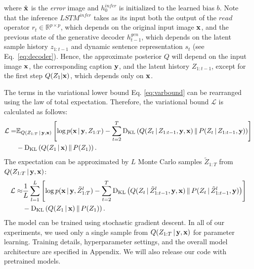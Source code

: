 \documentclass{article} %
\newcommand{\Eqref}[1]{Eq.~\ref{#1}} %
\newcommand{\given}{\,|\,}
\newcommand{\expectation}{\mathbb{E}}
\newcommand{\kldiv}{\mathrm{D}_{\rm KL}}
\newcommand{\klBars}{\,\|\,}
\newcommand{\hdec}{h^{gen}}
\newcommand{\henc}{h^{infer}}
\newcommand{\readop}{\mathit{read}}
\newcommand{\encoder}{\mathit{LSTM}^{infer}}
\newcommand{\Lat}{Z}
\newcommand{\numSamples}{L}
\newcommand{\sampleIdx}{l}
\newcommand{\LatSample}{\tilde{Z}}
\newcommand{\icaption}{{\bf{y}}}
\newcommand{\oimage}{{\bf{x}}}
\newcommand{\post}{Q}
\newcommand{\prior}{P}
\newcommand{\loss}{\mathcal{L}}
\newcommand{\real}{\mathbb{R}}
\begin{document}
where $\hat{\oimage}$ is the \textit{error} image and $\henc_0$ is initialized to the learned bias $b$. 
Note that the inference $\encoder$ 
takes as its input both the output
of the $\readop$ operator $r_t\in \real^{p\times p}$, which depends on the original input image $\oimage$,
and the previous state of the 
generative decoder $\hdec_{t-1}$, which depends on the latent sample history $z_{1:t-1}$ and 
dynamic sentence representation $s_t$ (see \Eqref{eq:decoder}). 
Hence, the approximate posterior $Q$ will depend on the input image $\oimage$,
the corresponding caption $\icaption$, and the latent history $\Lat_{1:t-1}$, except  
for the first step $Q(Z_1 | \oimage)$, which depends only on $\oimage$.  

The terms in the variational lower bound Eq. \ref{eq:varbound} can be rearranged using the law of total expectation. Therefore, the variational bound $\loss$ is calculated as follows:
\begin{align}
\label{eq:loss}
\loss =  &\expectation_{Q(\Lat_{1:T}\given\icaption,\oimage)}\left[ \log p(\oimage\given\icaption,\Lat_{1:T}) - \sum_{t=2}^T\kldiv\left(\post(\Lat_t\given\Lat_{1:t-1},\icaption,\oimage)\klBars\prior(\Lat_t\given\Lat_{1:t-1},\icaption)\right) \right] \nonumber \\& - \kldiv\left(\post(\Lat_1\given\oimage)\klBars\prior(\Lat_1)\right).
\end{align}
The expectation can be approximated by $\numSamples$ Monte Carlo samples $\LatSample_{1:T}$ from $\post(\Lat_{1:T}\given\icaption, \oimage)$:
\begin{align}
\label{eq:loss_mc}
\loss \approx  &\frac{1}{\numSamples}\sum_{\sampleIdx=1}^\numSamples\left[ \log p(\oimage\given\icaption,\LatSample^\sampleIdx_{1:T}) - \sum_{t=2}^T\kldiv\left(\post(\Lat_t\given\LatSample^\sampleIdx_{1:t-1},\icaption,\oimage)\klBars\prior(\Lat_t\given\LatSample^\sampleIdx_{1:t-1},\icaption)\right) \right] \nonumber \\& - \kldiv\left(\post(\Lat_1\given\oimage)\klBars\prior(\Lat_1)\right).
\end{align}
The model can be trained using stochastic gradient descent. 
In all of our experiments, we used only a single sample 
from $\post(\Lat_{1:T}\given\icaption, \oimage)$ for parameter learning.
Training details, hyperparameter settings,
and the overall model architecture are specified in Appendix. 
We will also release our code with pretrained models.
\end{document}
